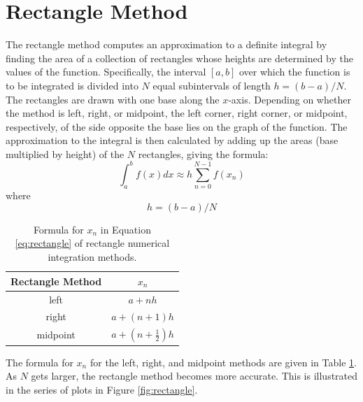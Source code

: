 \label{Numerical_Integration}

\section{Rectangle Method}
The rectangle method computes an approximation to a 
definite integral by finding the area of a collection of rectangles whose heights are determined 
by the values of the function.  Specifically, the interval $[a,b]$ over which the function is to 
be integrated is divided into $N$ equal subintervals of length $h = (b-a)/N$. The rectangles are 
drawn with one base along the $x$-axis. Depending on whether the method is left, right, or midpoint,
the left corner, right corner, or midpoint, respectively, of the side opposite the base lies on the 
graph of the function. The approximation to the integral is 
then calculated by adding up the areas (base multiplied by height) of the $N$ rectangles, giving the formula:
\begin{equation}
\int_a^b f(x) dx \approx h \sum_{n=0}^{N-1} f(x_n) \label{eq:rectangle}
\end{equation}
where
\begin{equation}
h=(b-a)/N 
\end{equation}

\begin{table}
\caption{Formula for $x_n$ in Equation \ref{eq:rectangle} of rectangle numerical integration methods.}
\label{tab:xn-rectangle}
\begin{tabular}{cc}\\\toprule
Rectangle Method & $x_n$ \\ \midrule
left & $a+nh$ \\ \midrule
right & $a+(n+1)h$ \\ \midrule
midpoint & $a+\left(n + \frac{1}{2}\right)h$ \\ \bottomrule
\end{tabular}
\end{table}

The formula for $x_n$ for the left, right, and midpoint methods are given in Table \ref{tab:xn-rectangle}.
As $N$ gets larger, the rectangle method becomes more accurate. This is illustrated in the series of plots
in Figure \ref{fig:rectangle}.

